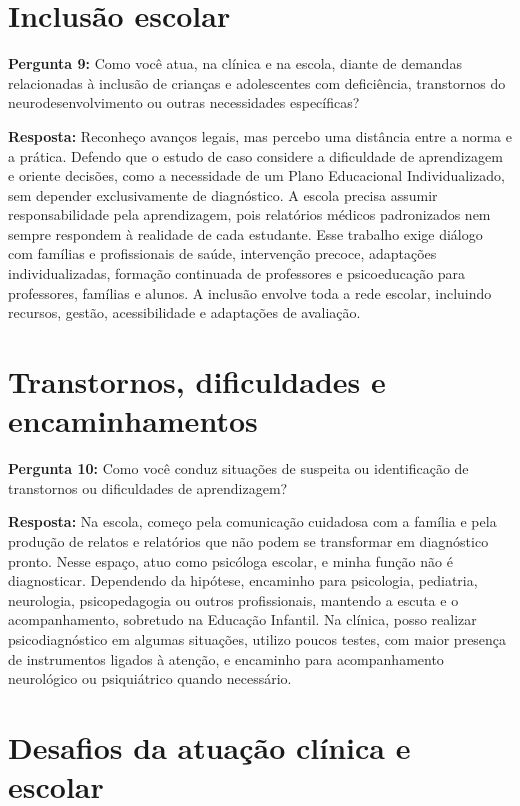 \documentclass[12pt,a4paper,oneside]{abntex2}
\begin{document}
\section{Inclusão escolar}

\noindent\textbf{Pergunta 9:} Como você atua, na clínica e na escola, diante de demandas relacionadas à inclusão de crianças e adolescentes com deficiência, transtornos do neurodesenvolvimento ou outras necessidades específicas?

\noindent\textbf{Resposta:} Reconheço avanços legais, mas percebo uma distância entre a norma e a prática. Defendo que o estudo de caso considere a dificuldade de aprendizagem e oriente decisões, como a necessidade de um Plano Educacional Individualizado, sem depender exclusivamente de diagnóstico. A escola precisa assumir responsabilidade pela aprendizagem, pois relatórios médicos padronizados nem sempre respondem à realidade de cada estudante. Esse trabalho exige diálogo com famílias e profissionais de saúde, intervenção precoce, adaptações individualizadas, formação continuada de professores e psicoeducação para professores, famílias e alunos. A inclusão envolve toda a rede escolar, incluindo recursos, gestão, acessibilidade e adaptações de avaliação.

\section{Transtornos, dificuldades e encaminhamentos}

\noindent\textbf{Pergunta 10:} Como você conduz situações de suspeita ou identificação de transtornos ou dificuldades de aprendizagem?

\noindent\textbf{Resposta:} Na escola, começo pela comunicação cuidadosa com a família e pela produção de relatos e relatórios que não podem se transformar em diagnóstico pronto. Nesse espaço, atuo como psicóloga escolar, e minha função não é diagnosticar. Dependendo da hipótese, encaminho para psicologia, pediatria, neurologia, psicopedagogia ou outros profissionais, mantendo a escuta e o acompanhamento, sobretudo na Educação Infantil. Na clínica, posso realizar psicodiagnóstico em algumas situações, utilizo poucos testes, com maior presença de instrumentos ligados à atenção, e encaminho para acompanhamento neurológico ou psiquiátrico quando necessário.

\section{Desafios da atuação clínica e escolar}
\end{document}
